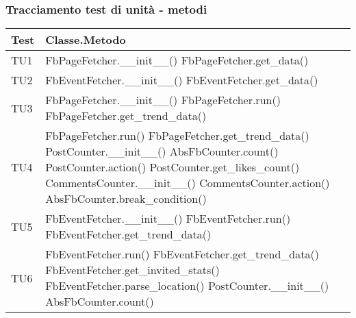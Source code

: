 		\subsubsection{Tracciamento test di unità - metodi}
			\begin{center}

			\def\arraystretch{1.5}
			\bgroup
			\begin{longtable}{| p{3cm} | p{9.5cm} |}
					\hline
					\textbf{Test} & \textbf{Classe.Metodo}\\
					\hline						
					TU1 & FbPageFetcher.\_\_init\_\_() \newline
					FbPageFetcher.get\_data() \\
					\hline
					TU2 & FbEventFetcher.\_\_init\_\_() \newline
					FbEventFetcher.get\_data() \\
					\hline
					TU3 & FbPageFetcher.\_\_init\_\_() \newline
					FbPageFetcher.run() \newline
					FbPageFetcher.get\_trend\_data() \\
					\hline
					TU4 & FbPageFetcher.run() \newline
					FbPageFetcher.get\_trend\_data() \newline
					PostCounter.\_\_init\_\_() \newline
					AbsFbCounter.count() \newline
					PostCounter.action() \newline
					PostCounter.get\_likes\_count() \newline
					CommentsCounter.\_\_init\_\_() \newline
					CommentsCounter.action() \newline
					AbsFbCounter.break\_condition()\\
					\hline
					TU5 & FbEventFetcher.\_\_init\_\_() \newline
					FbEventFetcher.run() \newline
					FbEventFetcher.get\_trend\_data() \\
					\hline
					TU6 & FbEventFetcher.run() \newline
					FbEventFetcher.get\_trend\_data() \newline
					FbEventFetcher.get\_invited\_stats() \newline
					FbEventFetcher.parse\_location() \newline
					PostCounter.\_\_init\_\_() \newline
					AbsFbCounter.count() \newline

\end{longtable}
\end{center}
